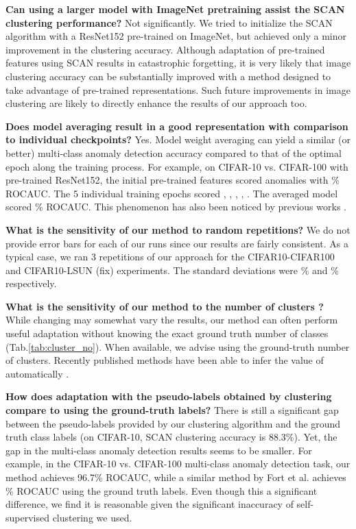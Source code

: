 \documentclass[runningheads]{llncs}
\begin{document}
\textbf{Can using a larger model with ImageNet pretraining assist the SCAN clustering performance?} Not significantly. We tried to initialize the SCAN algorithm with a ResNet152 pre-trained on ImageNet, but achieved only a minor improvement in the clustering accuracy. Although adaptation of pre-trained features using SCAN results in catastrophic forgetting, it is very likely that image clustering accuracy can be substantially improved with a method designed to take advantage of pre-trained representations. Such future improvements in image clustering are likely to directly enhance the results of our approach too.


\textbf{Does model averaging result in a good representation with comparison to individual checkpoints?} Yes. Model weight averaging can yield a similar (or better) multi-class anomaly detection accuracy compared to that of the optimal epoch along the training process. For example, on CIFAR-10 vs. CIFAR-100 with pre-trained ResNet152, the initial pre-trained features scored anomalies with \% ROCAUC. The 5 individual training epochs scored , , , , . The averaged model scored \% ROCAUC. This phenomenon has also been noticed by previous works \cite{matena2021merging}. 

\textbf{What is the sensitivity of our method to random repetitions?}
We do not provide error bars for each of our runs since our results are fairly consistent. As a typical case, we ran 3 repetitions of our approach for the  CIFAR10-CIFAR100 and CIFAR10-LSUN (fix) experiments. The standard deviations were \% and \% respectively. 

\textbf{What is the sensitivity of our method to the number of clusters ?} While changing  may somewhat vary the results, our method can often perform useful adaptation without knowing the exact ground truth number of classes (Tab.\ref{tab:cluster_no}). When available, we advise using the ground-truth number of clusters. Recently published methods have been able to infer the value of  automatically \cite{ronen2022deepdpm}.

\textbf{How does adaptation with the pseudo-labels obtained by clustering compare to using the ground-truth labels?} There is still a significant gap between the pseudo-labels provided by our clustering algorithm and the ground truth class labels (on CIFAR-10, SCAN clustering accuracy is 88.3\%). Yet, the gap in the multi-class anomaly detection results seems to be smaller. For example, in the CIFAR-10 vs. CIFAR-100 multi-class anomaly detection task, our method achieves 96.7\% ROCAUC, while a similar method by Fort et al. \cite{fort2021exploring} achieves \% ROCAUC using the ground truth labels. Even though this a significant difference, we find it is reasonable given the significant inaccuracy of self-supervised clustering we used.
\end{document}
